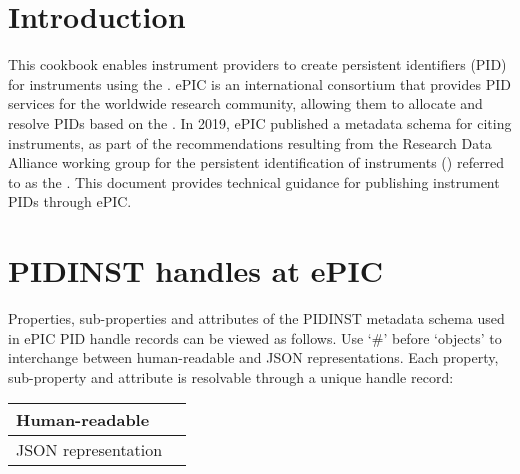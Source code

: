 \documentclass[a4paper,10pt,english]{sphinxmanual}
\begin{document}
\section{Introduction}
\label{\detokenize{cookbook/intro:introduction}}\label{\detokenize{cookbook/intro::doc}}
This cookbook enables instrument providers to create persistent
identifiers (PID) for instruments using the .
ePIC is an international consortium that provides PID services for the
worldwide research community, allowing them to allocate and resolve
PIDs based on the .  In 2019, ePIC published a
metadata schema for citing instruments, as part of the recommendations
resulting from the Research Data Alliance working group for the
persistent identification of instruments () referred to as
the .  This document provides technical
guidance for publishing instrument PIDs through ePIC.


\section{PIDINST handles at ePIC}
\label{\detokenize{cookbook/handles:pidinst-handles-at-epic}}\label{\detokenize{cookbook/handles::doc}}
Properties, sub-properties and attributes of the PIDINST metadata
schema used in ePIC PID handle records can be viewed as follows.  Use
‘\#’ before ‘objects’ to interchange between human-readable and JSON
representations.  Each property, sub-property and attribute is
resolvable through a unique handle record:


\begin{savenotes}\sphinxattablestart
\centering
\begin{tabulary}{\linewidth}[t]{|T|T|}
\hline

Human-readable
&
\\
\hline
JSON representation
&
\\
\hline
\end{tabulary}
\par
\sphinxattableend\end{savenotes}
\end{document}
